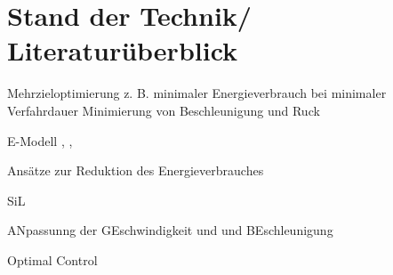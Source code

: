 \chapter{Stand der Technik/ Literaturüberblick}

Mehrzieloptimierung z. B. minimaler Energieverbrauch bei minimaler Verfahrdauer \cite{Lin.2018} Minimierung von Beschleunigung und Ruck  \cite{Saravanan.2008}

E-Modell \cite{Pellicciari.2011}, \cite[S.~1]{Hansen.2012}, \cite{Ziaukas.2017}

Ansätze zur Reduktion des Energieverbrauches  \cite{Paryanto.2015} \cite{Pellicciari.2015} \cite{Carabin.2017}

SiL \cite[S-~56]{Eggers.2019}

ANpassunng der GEschwindigkeit und und BEschleunigung \cite[S.~57]{Eggers.2019}

Optimal Control \cite{Bjorkenstam.2013}